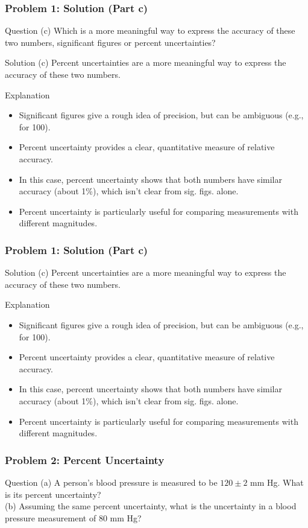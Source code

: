 \documentclass{beamer}
\begin{document}
\begin{frame}
\frametitle{Problem 1: Solution (Part c)}
\begin{block}{Question}
(c) Which is a more meaningful way to express the accuracy of these two numbers, significant figures or percent uncertainties?
\end{block}
\begin{block}{Solution}
(c) Percent uncertainties are a more meaningful way to express the accuracy of these two numbers.
\end{block}
\begin{block}{Explanation}
\begin{itemize}
\item Significant figures give a rough idea of precision, but can be ambiguous (e.g., for 100).
\item Percent uncertainty provides a clear, quantitative measure of relative accuracy.
\item In this case, percent uncertainty shows that both numbers have similar accuracy (about 1\%), which isn't clear from sig. figs. alone.
\item Percent uncertainty is particularly useful for comparing measurements with different magnitudes.
\end{itemize}
\end{block}
\end{frame}\begin{frame}
\frametitle{Problem 1: Solution (Part c)}
\begin{block}{Solution}
(c) Percent uncertainties are a more meaningful way to express the accuracy of these two numbers.
\end{block}
\begin{block}{Explanation}
\begin{itemize}
\item Significant figures give a rough idea of precision, but can be ambiguous (e.g., for 100).
\item Percent uncertainty provides a clear, quantitative measure of relative accuracy.
\item In this case, percent uncertainty shows that both numbers have similar accuracy (about 1\%), which isn't clear from sig. figs. alone.
\item Percent uncertainty is particularly useful for comparing measurements with different magnitudes.
\end{itemize}
\end{block}
\end{frame}
\begin{frame}
\frametitle{Problem 2: Percent Uncertainty}
\begin{block}{Question}
(a) A person's blood pressure is measured to be $120 \pm 2$ mm Hg. What is its percent uncertainty?\\
(b) Assuming the same percent uncertainty, what is the uncertainty in a blood pressure measurement of 80 mm Hg?
\end{block}
\end{frame}
\end{document}
